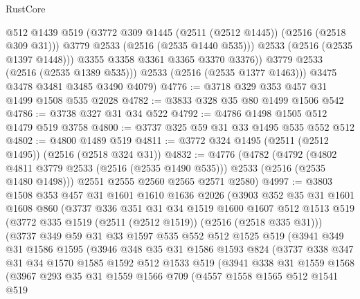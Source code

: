 \begin{lexlean}{RustCore}
\begin{coremodule}
                  @512
                  @1439
                  @519
                  (@3772 @309 @1445 (@2511 (@2512 @1445)) (@2516 (@2518 @309 @31)))
                  @3779
                  @2533
                  (@2516 (@2535 @1440 @535)))
                @2533
                (@2516 (@2535 @1397 @1448)))
              @3355
              @3358
              @3361
              @3365
              @3370
              @3376))
          @3779
          @2533
          (@2516 (@2535 @1389 @535)))
        @2533
        (@2516 (@2535 @1377 @1463)))
      @3475
      @3478
      @3481
      @3485
      @3490
      @4079)
@4776 := @3718 @329 @353 @457 @31 @1499 @1508 @535 @2028
@4782 := @3833 @328 @35 @80 @1499 @1506 @542
@4786 := @3738 @327 @31 @34 @522
@4792 := @4786 @1498 @1505 @512 @1479 @519 @3758
@4800 := @3737 @325 @59 @31 @33 @1495 @535 @552 @512
@4802 := @4800 @1489 @519
@4811 := @3772 @324 @1495 (@2511 (@2512 @1495)) (@2516 (@2518 @324 @31))
@4832 := @4776
    (@4782
      (@4792 (@4802 @4811 @3779 @2533 (@2516 (@2535 @1490 @535))) @2533 (@2516 (@2535 @1480 @1498)))
      @2551
      @2555
      @2560
      @2565
      @2571
      @2580)
@4997 := @3803
    @1508
    @353
    @457
    @31
    @1601
    @1610
    @1636
    @2026
    (@3903
      @352
      @35
      @31
      @1601
      @1608
      @860
      (@3737
        @336
        @351
        @31
        @34
        @1519
        @1600
        @1607
        @512
        @1513
        @519
        (@3772 @335 @1519 (@2511 (@2512 @1519)) (@2516 (@2518 @335 @31)))
        (@3737
          @349
          @59
          @31
          @33
          @1597
          @535
          @552
          @512
          @1525
          @519
          (@3941
            @349
            @31
            @1586
            @1595
            (@3946
              @348
              @35
              @31
              @1586
              @1593
              @824
              (@3737
                @338
                @347
                @31
                @34
                @1570
                @1585
                @1592
                @512
                @1533
                @519
                (@3941
                  @338
                  @31
                  @1559
                  @1568
                  (@3967
                    @293
                    @35
                    @31
                    @1559
                    @1566
                    @709
                    (@4557
                      @1558
                      @1565
                      @512
                      @1541
                      @519

\end{coremodule}
\end{lexlean}
